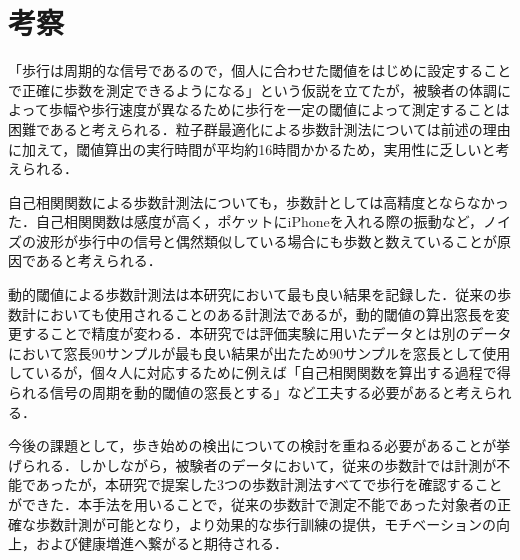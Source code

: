 \chapter{考察}
「歩行は周期的な信号であるので，個人に合わせた閾値をはじめに設定することで正確に歩数を測定できるようになる」という仮説を立てたが，被験者の体調によって歩幅や歩行速度が異なるために歩行を一定の閾値によって測定することは困難であると考えられる．粒子群最適化による歩数計測法については前述の理由に加えて，閾値算出の実行時間が平均約16時間かかるため，実用性に乏しいと考えられる．

自己相関関数による歩数計測法についても，歩数計としては高精度とならなかった．自己相関関数は感度が高く，ポケットにiPhoneを入れる際の振動など，ノイズの波形が歩行中の信号と偶然類似している場合にも歩数と数えていることが原因であると考えられる．

動的閾値による歩数計測法は本研究において最も良い結果を記録した．従来の歩数計においても使用されることのある計測法であるが，動的閾値の算出窓長を変更することで精度が変わる．本研究では評価実験に用いたデータとは別のデータにおいて窓長90サンプルが最も良い結果が出たため90サンプルを窓長として使用しているが，個々人に対応するために例えば「自己相関関数を算出する過程で得られる信号の周期を動的閾値の窓長とする」など工夫する必要があると考えられる．

今後の課題として，歩き始めの検出についての検討を重ねる必要があることが挙げられる．しかしながら，被験者のデータにおいて，従来の歩数計では計測が不能であったが，本研究で提案した3つの歩数計測法すべてで歩行を確認することができた．本手法を用いることで，従来の歩数計で測定不能であった対象者の正確な歩数計測が可能となり，より効果的な歩行訓練の提供，モチベーションの向上，および健康増進へ繋がると期待される．
